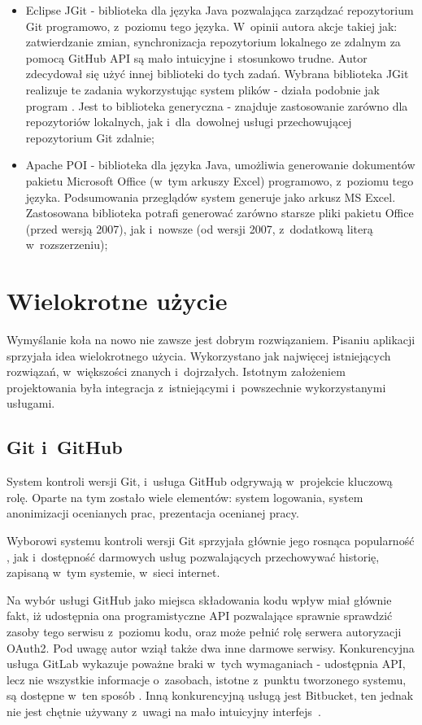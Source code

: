 \begin{itemize}
\medskip
\item Eclipse JGit - biblioteka dla języka Java pozwalająca zarządzać repozytorium Git programowo, z~poziomu tego języka. W~opinii autora akcje takiej jak: zatwierdzanie zmian, synchronizacja repozytorium lokalnego ze zdalnym za pomocą GitHub API są mało intuicyjne i~stosunkowo trudne. Autor zdecydował się użyć innej biblioteki do tych zadań. Wybrana biblioteka JGit realizuje te zadania wykorzystując system plików - działa podobnie jak program . Jest to biblioteka generyczna - znajduje zastosowanie zarówno dla repozytoriów lokalnych, jak i~dla~dowolnej usługi przechowującej repozytorium Git zdalnie;

\medskip
\item Apache POI - biblioteka dla języka Java, umożliwia generowanie dokumentów pakietu Microsoft Office (w~tym arkuszy Excel) programowo, z~poziomu tego języka. Podsumowania przeglądów system generuje jako arkusz MS Excel. Zastosowana biblioteka potrafi generować zarówno starsze pliki pakietu Office (przed wersją 2007), jak i~nowsze (od wersji 2007, z~dodatkową literą  w~rozszerzeniu);

\end{itemize}

\section{Wielokrotne użycie}
Wymyślanie koła na nowo nie zawsze jest dobrym rozwiązaniem. Pisaniu aplikacji sprzyjała idea wielokrotnego użycia. Wykorzystano jak najwięcej istniejących rozwiązań, w~większości znanych i~dojrzałych. Istotnym założeniem projektowania była integracja z~istniejącymi i~powszechnie wykorzystanymi usługami.
 
\subsection{Git i~GitHub}
System kontroli wersji Git, i~usługa GitHub odgrywają w~projekcie kluczową rolę. Oparte na tym zostało wiele elementów: system logowania, system anonimizacji ocenianych prac, prezentacja ocenianej pracy.

\medskip
Wyborowi systemu kontroli wersji Git sprzyjała głównie jego rosnąca popularność \cite{EclipseSurvey}, jak i~dostępność darmowych usług pozwalających przechowywać historię, zapisaną w~tym systemie, w~sieci internet.

\medskip
Na wybór usługi GitHub jako miejsca składowania kodu wpływ miał głównie fakt, iż udostępnia ona programistyczne API pozwalające sprawnie sprawdzić zasoby tego serwisu z~poziomu kodu, oraz może pełnić rolę serwera autoryzacji OAuth2. Pod uwagę autor wziął także dwa inne darmowe serwisy. Konkurencyjna usługa GitLab wykazuje poważne braki w~tych wymaganiach - udostępnia API, lecz nie wszystkie informacje o~zasobach, istotne z~punktu tworzonego systemu, są dostępne w~ten sposób \cite{GitLabApiDoc}. Inną konkurencyjną usługą jest Bitbucket, ten jednak nie jest chętnie używany z~uwagi na mało intuicyjny interfejs~\cite{GitOrBit}.

